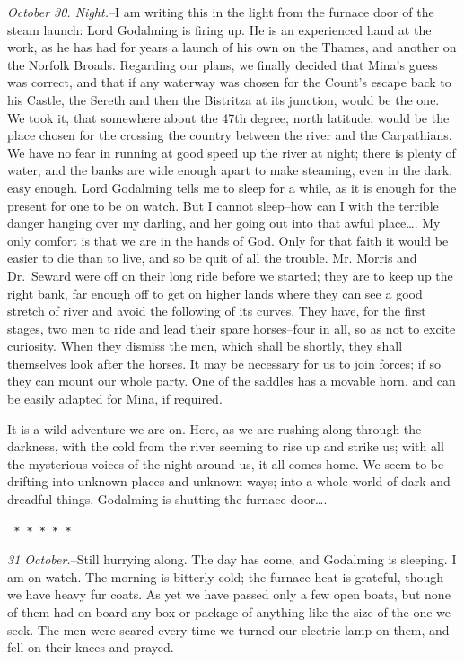 \documentclass[12pt,openright]{book}
\begin{document}
\textit{October 30. Night.}–I am writing this in the light from the furnace door of the steam launch: Lord Godalming is firing up. He is an experienced hand at the work, as he has had for years a launch of his own on the Thames, and another on the Norfolk Broads. Regarding our plans, we finally decided that Mina’s guess was correct, and that if any waterway was chosen for the Count’s escape back to his Castle, the Sereth and then the Bistritza at its junction, would be the one. We took it, that somewhere about the 47th degree, north latitude, would be the place chosen for the crossing the country between the river and the Carpathians. We have no fear in running at good speed up the river at night; there is plenty of water, and the banks are wide enough apart to make steaming, even in the dark, easy enough. Lord Godalming tells me to sleep for a while, as it is enough for the present for one to be on watch. But I cannot sleep–how can I with the terrible danger hanging over my darling, and her going out into that awful place…. My only comfort is that we are in the hands of God. Only for that faith it would be easier to die than to live, and so be quit of all the trouble. Mr. Morris and Dr. Seward were off on their long ride before we started; they are to keep up the right bank, far enough off to get on higher lands where they can see a good stretch of river and avoid the following of its curves. They have, for the first stages, two men to ride and lead their spare horses–four in all, so as not to excite curiosity. When they dismiss the men, which shall be shortly, they shall themselves look after the horses. It may be necessary for us to join forces; if so they can mount our whole party. One of the saddles has a movable horn, and can be easily adapted for Mina, if required.

It is a wild adventure we are on. Here, as we are rushing along through the darkness, with the cold from the river seeming to rise up and strike us; with all the mysterious voices of the night around us, it all comes home. We seem to be drifting into unknown places and unknown ways; into a whole world of dark and dreadful things. Godalming is shutting the furnace door….

\texttt{   *       *       *       *       *}

\textit{31 October.}–Still hurrying along. The day has come, and Godalming is sleeping. I am on watch. The morning is bitterly cold; the furnace heat is grateful, though we have heavy fur coats. As yet we have passed only a few open boats, but none of them had on board any box or package of anything like the size of the one we seek. The men were scared every time we turned our electric lamp on them, and fell on their knees and prayed.
\end{document}
